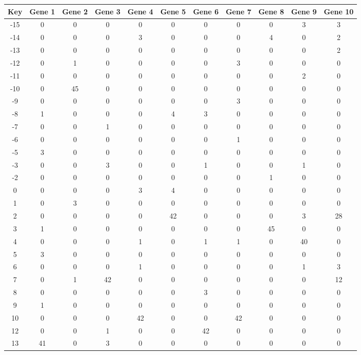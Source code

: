 \begin{tabular}{|c|c|c|c|c|c|c|c|c|c|c|}
\hline
Key & Gene 1 & Gene 2 & Gene 3 & Gene 4 & Gene 5 & Gene 6 & Gene 7 & Gene 8 & Gene 9 & Gene 10 \\
\hline
-15 & 0 & 0 & 0 & 0 & 0 & 0 & 0 & 0 & 3 & 3 \\
-14 & 0 & 0 & 0 & 3 & 0 & 0 & 0 & 4 & 0 & 2 \\
-13 & 0 & 0 & 0 & 0 & 0 & 0 & 0 & 0 & 0 & 2 \\
-12 & 0 & 1 & 0 & 0 & 0 & 0 & 3 & 0 & 0 & 0 \\
-11 & 0 & 0 & 0 & 0 & 0 & 0 & 0 & 0 & 2 & 0 \\
-10 & 0 & 45 & 0 & 0 & 0 & 0 & 0 & 0 & 0 & 0 \\
-9 & 0 & 0 & 0 & 0 & 0 & 0 & 3 & 0 & 0 & 0 \\
-8 & 1 & 0 & 0 & 0 & 4 & 3 & 0 & 0 & 0 & 0 \\
-7 & 0 & 0 & 1 & 0 & 0 & 0 & 0 & 0 & 0 & 0 \\
-6 & 0 & 0 & 0 & 0 & 0 & 0 & 1 & 0 & 0 & 0 \\
-5 & 3 & 0 & 0 & 0 & 0 & 0 & 0 & 0 & 0 & 0 \\
-3 & 0 & 0 & 3 & 0 & 0 & 1 & 0 & 0 & 1 & 0 \\
-2 & 0 & 0 & 0 & 0 & 0 & 0 & 0 & 1 & 0 & 0 \\
0 & 0 & 0 & 0 & 3 & 4 & 0 & 0 & 0 & 0 & 0 \\
1 & 0 & 3 & 0 & 0 & 0 & 0 & 0 & 0 & 0 & 0 \\
2 & 0 & 0 & 0 & 0 & 42 & 0 & 0 & 0 & 3 & 28 \\
3 & 1 & 0 & 0 & 0 & 0 & 0 & 0 & 45 & 0 & 0 \\
4 & 0 & 0 & 0 & 1 & 0 & 1 & 1 & 0 & 40 & 0 \\
5 & 3 & 0 & 0 & 0 & 0 & 0 & 0 & 0 & 0 & 0 \\
6 & 0 & 0 & 0 & 1 & 0 & 0 & 0 & 0 & 1 & 3 \\
7 & 0 & 1 & 42 & 0 & 0 & 0 & 0 & 0 & 0 & 12 \\
8 & 0 & 0 & 0 & 0 & 0 & 3 & 0 & 0 & 0 & 0 \\
9 & 1 & 0 & 0 & 0 & 0 & 0 & 0 & 0 & 0 & 0 \\
10 & 0 & 0 & 0 & 42 & 0 & 0 & 42 & 0 & 0 & 0 \\
12 & 0 & 0 & 1 & 0 & 0 & 42 & 0 & 0 & 0 & 0 \\
13 & 41 & 0 & 3 & 0 & 0 & 0 & 0 & 0 & 0 & 0 \\
\hline
\end{tabular}
